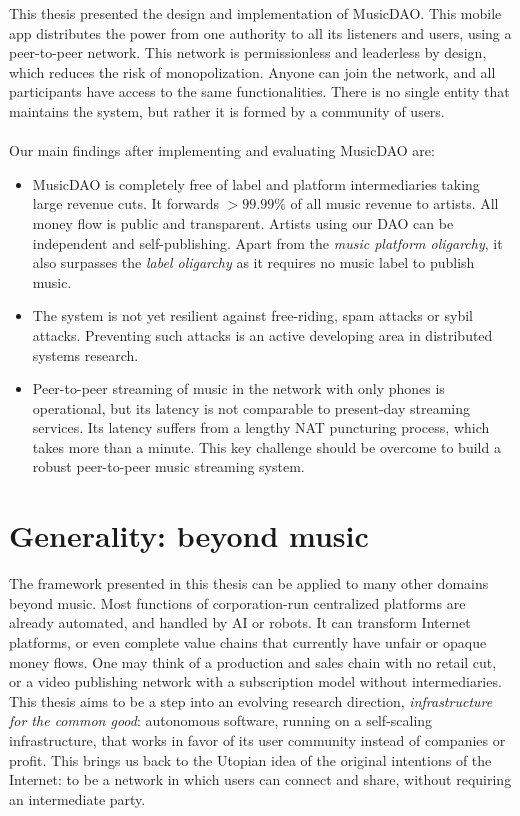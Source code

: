 This thesis presented the design and implementation of MusicDAO. This mobile app distributes the power from one authority to all its listeners and users, using a peer-to-peer network. This network is permissionless and leaderless by design, which reduces the risk of monopolization. Anyone can join the network, and all participants have access to the same functionalities. There is no single entity that maintains the system, but rather it is formed by a community of users.
\\
\\
Our main findings after implementing and evaluating MusicDAO are:
\begin{itemize}
    \item MusicDAO is completely free of label and platform intermediaries taking large revenue cuts. It forwards $>99.99\%$ of all music revenue to artists. All money flow is public and transparent. Artists using our DAO can be independent and self-publishing. Apart from the \textit{music platform oligarchy}, it also surpasses the \textit{label oligarchy} as it requires no music label to publish music.
    \item The system is not yet resilient against free-riding, spam attacks or sybil attacks. Preventing such attacks is an active developing area in distributed systems research.
    \item Peer-to-peer streaming of music in the network with only phones is operational, but its latency is not comparable to present-day streaming services. Its latency suffers from a lengthy NAT puncturing process, which takes more than a minute. This key challenge should be overcome to build a robust peer-to-peer music streaming system.
\end{itemize}

\section{Generality: beyond music}
The framework presented in this thesis can be applied to many other domains beyond music. Most functions of corporation-run centralized platforms are already automated, and handled by AI or robots. It can transform Internet platforms, or even complete value chains that currently have unfair or opaque money flows. One may think of a production and sales chain with no retail cut, or a video publishing network with a subscription model without intermediaries. This thesis aims to be a step into an evolving research direction, \textit{infrastructure for the common good}: autonomous software, running on a self-scaling infrastructure, that works in favor of its user community instead of companies or profit. This brings us back to the Utopian idea of the original intentions of the Internet: to be a network in which users can connect and share, without requiring an intermediate party.


